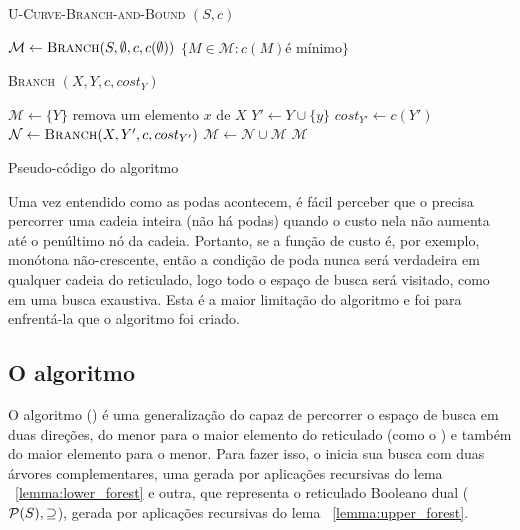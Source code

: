 \begin{algorithm}[!ht]
\textsc{U-Curve-Branch-and-Bound} $(S, c)$
\begin{algorithmic}[1]
    \State $\mathcal{M} \gets {\normalfont\textsc{Branch}} (S, \emptyset, c, c (\emptyset))$
    \Return $\{M \in \mathcal{M} : c(M) \text{é mínimo}\}$
\end{algorithmic}
\vspace{1em}

\textsc{Branch} $(X, Y, c, cost_Y)$
\begin{algorithmic}[1]
    \State $\mathcal{M} \gets \{Y\}$
        \State remova um elemento $x$ de $X$
        \State $Y' \gets Y \cup \{y\}$
        \State $cost_{Y'} \gets c (Y')$
            \State $\mathcal{N} \gets {\normalfont\textsc{Branch}} (X, Y', c, cost_{Y'})$
            \State $\mathcal{M} \gets \mathcal{N} \cup \mathcal{M}$
        \EndIf
    \EndWhile
    \Return $\mathcal{M}$
\end{algorithmic}
\caption{Pseudo-código do algoritmo }
\label{pfs:code:ubb}
\end{algorithm}

Uma vez entendido como as podas acontecem, é fácil perceber que o 
 precisa percorrer uma cadeia inteira (não há podas) quando
o custo nela não aumenta até o penúltimo nó da cadeia. Portanto, se a 
função de custo é, por exemplo, monótona não-crescente, então a condição
de poda nunca será verdadeira em qualquer cadeia do reticulado, logo 
todo o espaço de busca será visitado, como em uma busca exaustiva. Esta
é a maior limitação do algoritmo  e foi para enfrentá-la 
que o algoritmo  foi criado.

\subsection{O algoritmo }
O algoritmo  () é uma 
generalização do  capaz de percorrer o espaço de busca em
duas direções, do menor para o maior elemento do reticulado 
(como o ) e também do maior elemento para o menor. 
Para fazer isso, o  inicia sua busca com duas árvores 
complementares, uma gerada por 
aplicações recursivas do lema ~\ref{lemma:lower_forest} e outra, que 
representa o reticulado Booleano dual ($\mathcal{P} (S), \supseteq$), 
gerada por aplicações recursivas do lema ~\ref{lemma:upper_forest}.

